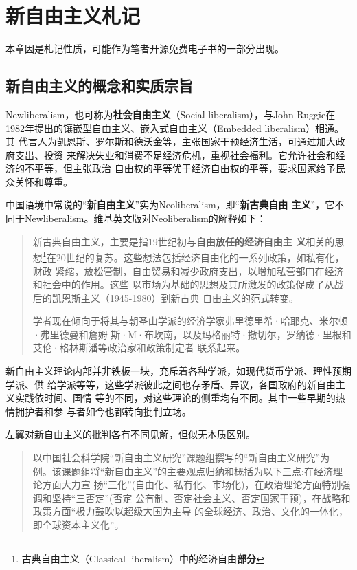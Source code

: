 \chapter{新自由主义札记}
\label{chap:neoliber}

本章因是札记性质，可能作为笔者开源免费电子书的一部分出现。

\section{新自由主义的概念和实质宗旨}

Newliberalism，也可称为\textbf{社会自由主义}（Social liberalism），与John
Ruggie在1982年提出的镶嵌型自由主义、嵌入式自由主义（Embedded liberalism）相通。其
代言人为凯恩斯、罗尔斯和德沃金等，主张国家干预经济生活，可通过加大政府支出、投资
来解决失业和消费不足经济危机，重视社会福利。它允许社会和经济的不平等，但主张政治
自由权的平等优于经济自由权的平等，要求国家给予民众关怀和尊重。\cite{newneo}

中国语境中常说的“\textbf{新自由主义}”实为Neoliberalism，即“\textbf{新古典自由
  主义}”，它不同于Newliberalism。维基英文版对Neoliberalism的解释如下：
\begin{quotation}新古典自由主义，主要是指19世纪初与\textbf{自由放任的经济自由主
    义}相关的思想\footnote{古典自由主义（Classical liberalism）中的经济自由\textbf{部分}}在20世纪的复苏。这些想法包括经济自由化的一系列政策，如私有化，财政
  紧缩，放松管制，自由贸易和减少政府支出，以增加私营部门在经济和社会中的作用。这些
  以市场为基础的思想及其所激发的政策促成了从战后的凯恩斯主义（1945-1980）到新古典
  自由主义的范式转变。

  学者现在倾向于将其与朝圣山学派的经济学家弗里德里希·哈耶克、米尔顿·弗里德曼和詹姆
  斯·M·布坎南，以及玛格丽特·撒切尔，罗纳德·里根和艾伦·格林斯潘等政治家和政策制定者
  联系起来。
\end{quotation}

新自由主义理论内部并非铁板一块，充斥着各种学派，如现代货币学派、理性预期学派、供
给学派等等，这些学派彼此之间也存矛盾、异议，各国政府的新自由主义实践依时间、国情
等的不同，对这些理论的侧重均有不同。\cite{neoxuepai}其中一些早期的热情拥护者和参
与者如今也都转向批判立场。

左翼对新自由主义的批判各有不同见解，但似无本质区别。
\begin{quotation}
  以中国社会科学院“新自由主义研究”课题组撰写的“新自由主义研究”为
  例。该课题组将“新自由主义”的主要观点归纳和概括为以下三点:在经济理论方面大力宣
  扬“三化”(自由化、私有化、市场化)，在政治理论方面特别强调和坚持“三否定”(否定
  公有制、否定社会主义、否定国家干预)，在战略和政策方面“极力鼓吹以超级大国为主导
  的全球经济、政治、文化的一体化，即全球资本主义化”。\cite{newneo}
\end{quotation}

